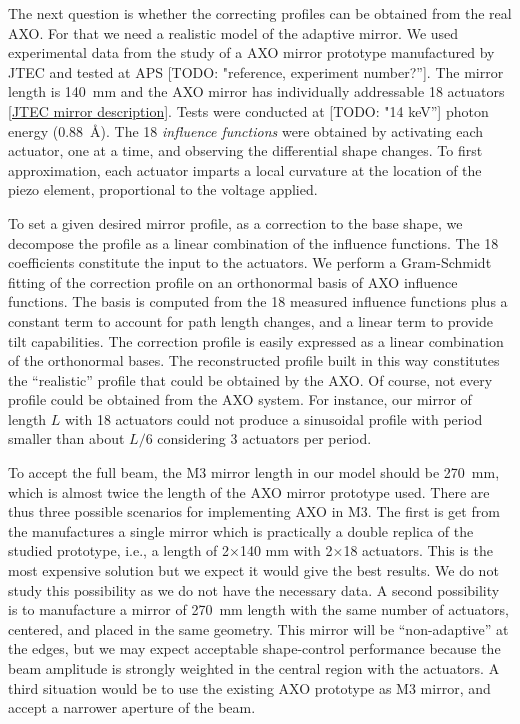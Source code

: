 \documentclass[preprint]{iucr}
\newcommand{\todo}[1]{{\color{red}[TODO: "#1'']}}
\begin{document}
The next question is whether the correcting profiles can be obtained from the real AXO. For that we need a realistic model of the adaptive mirror. We used experimental data from the study of a AXO mirror prototype manufactured by JTEC and tested at APS \todo{reference, experiment number?}. The mirror length is 140~mm and the AXO mirror has individually addressable 18 actuators \ref{JTEC mirror description}. Tests were conducted at \todo{14 keV} photon energy (0.88~\AA). The 18 \emph{influence functions} were obtained by activating each actuator, one at a time, and observing the differential shape changes. To first approximation, each actuator imparts a local curvature at the location of the piezo element, proportional to the voltage applied.

To set a given desired mirror profile, as a correction to the base shape, we decompose the profile as a linear combination of the influence functions. The 18 coefficients constitute the input to the actuators. We perform a Gram-Schmidt fitting of the correction profile on an orthonormal basis of AXO influence functions. The basis is computed from the 18 measured influence functions plus a constant term to account for path length changes, and a linear term to provide tilt capabilities. The correction profile is easily expressed as a linear combination of the orthonormal bases. The reconstructed profile built in this way constitutes the ``realistic'' profile that could be obtained by the AXO. Of course, not every profile could be obtained from the AXO system. For instance, our mirror of length $L$ with 18 actuators could not produce a sinusoidal profile with period smaller than about $L/6$ considering 3 actuators per period. 

To accept the full beam, the M3 mirror length in our model should be 270~mm, which is almost twice the length of the AXO mirror prototype used. There are thus three possible scenarios for implementing AXO in M3. The first is get from the manufactures a single mirror which is practically a double replica of the studied prototype, i.e., a length of 2$\times$140 mm with 2$\times$18 actuators. This is the most expensive solution but we expect it would give the best results. We do not study this possibility as we do not have the necessary data. A second possibility is to manufacture a mirror of 270~mm length with the same number of actuators, centered, and placed in the same geometry. This mirror will be ``non-adaptive'' at the edges, but we may expect acceptable shape-control performance because the beam amplitude is strongly weighted in the central region with the actuators. A third situation would be to use the existing AXO prototype as M3 mirror, and accept a narrower aperture of the beam.
\end{document}
